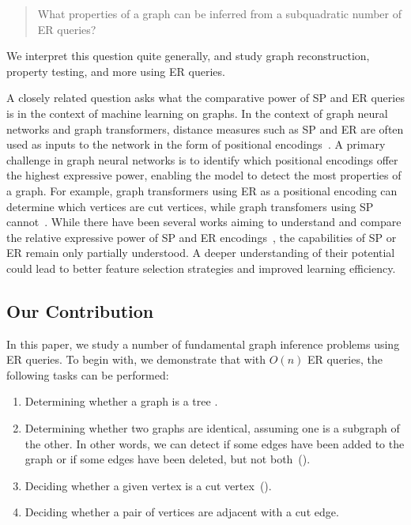\begin{quote}
What properties of a graph can be inferred from a subquadratic number of ER queries?
\end{quote}
We interpret this question quite generally, and study graph reconstruction, property testing, and more using ER queries. 

A closely related question asks what the comparative power of SP and ER queries is in the context of machine learning on graphs. In the context of graph neural networks and graph transformers, distance measures such as SP and ER are often used as inputs to the network in the form of positional encodings~\citep{zhang2023rethinking,velingker2024affinity}. A primary challenge in graph neural networks is to identify which positional encodings offer the highest expressive power, enabling the model to detect the most properties of a graph. For example, graph transformers using ER as a positional encoding can determine which vertices are cut vertices, while graph transfomers using SP cannot~\citep{zhang2023rethinking}. While there have been several works aiming to understand and compare the relative expressive power of SP and ER encodings~\citep{zhang2023rethinking, black2024comparing, velingker2024affinity}, the capabilities of SP or ER remain only partially understood. A deeper understanding of their potential could lead to better feature selection strategies and improved learning efficiency.


\subsection{Our Contribution}
In this paper, we study a number of fundamental graph inference problems using ER queries.
To begin with, we demonstrate that with $O(n)$ ER queries, the following tasks can be performed:

\begin{enumerate}[(1)]
    \item Determining whether a graph is a tree .
    \item Determining whether two graphs are identical, assuming one is a subgraph of the other. In other words, we can detect if some edges have been added to the graph or if some edges have been deleted, but not both~().
    \item Deciding whether a given vertex is a cut vertex~().
    \item Deciding whether a pair of vertices are adjacent with a cut edge.
\end{enumerate}

